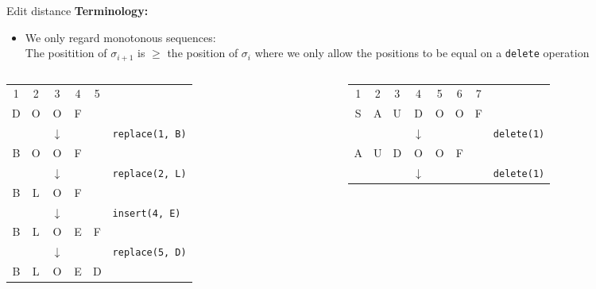 \begin{frame}{Edit distance}
  \textbf{Terminology:}
  \begin{itemize}
    \item
      We only regard {\color{Mittel-Blau}monotonous} sequences:\\
      The positition of $\sigma_{i+1}$ is $\geq$ the position of $\sigma_i$
      where we only allow the positions to be equal on a \texttt{delete}
      operation
  \end{itemize}
  \begin{columns}
    \begin{column}{0.5\linewidth}
      \begin{center}
        \begin{tabular}{c@{}c@{}c@{}c@{}cl}
          1 & 2 & 3 & 4 & 5\\
          D & O & O & F\\
          {} & {} & $\downarrow$ & {} & {} &
          \texttt{replace({\color{Mittel-Blau}1}, B)}\\
          B & O & O & F\\
          {} & {} & $\downarrow$ & {} & {} &
          \texttt{replace({\color{Mittel-Blau}2}, L)}\\
          B & L & O & F\\
          {} & {} & $\downarrow$ & {} & {} &
          \texttt{insert({\color{Mittel-Blau}4}, E)}\\
          B & L & O & E & F\\
          {} & {} & $\downarrow$ & {} & {} &
          \texttt{replace({\color{Mittel-Blau}5}, D)}\\
          B & L & O & E & D
        \end{tabular}
      \end{center}
    \end{column}
    \begin{column}{0.5\linewidth}
      \begin{center}
        \begin{tabular}{c@{}c@{}c@{}c@{}c@{}c@{}cl}
          1 & 2 & 3 & 4 & 5 & 6 & 7\\
          S & A & U & D & O & O & F\\
          {} & {} & {} & $\downarrow$ & {} & {} & {} &
          \texttt{delete({\color{Mittel-Blau}1})}\\
          A & U & D & O & O & F\\
          {} & {} & {} & $\downarrow$ & {} & {} & {} &
          \texttt{delete({\color{Mittel-Blau}1})}\\

\end{tabular}
\end{center}
\end{column}
\end{columns}
\end{frame}
